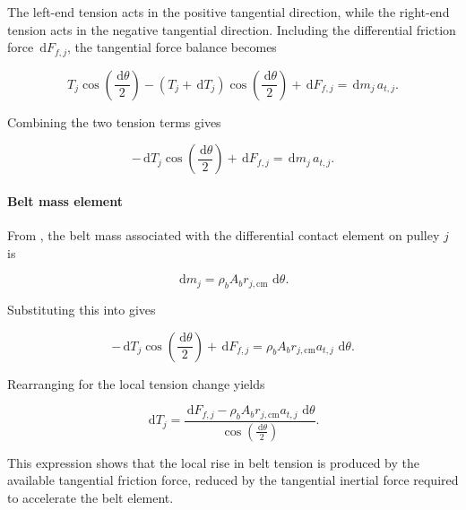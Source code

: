 \documentclass[11pt]{article}
\numberwithin{equation}{section}
\newcommand{\dd}{\,\mathrm{d}}
\begin{document}
The left-end tension acts in the positive tangential direction, while the
right-end tension acts in the negative tangential direction. Including the
differential friction force $\dd F_{f,j}$, the tangential force balance becomes

\begin{equation}
T_j\cos\!\left(\frac{\dd \theta}{2}\right)
-
(T_j+\dd T_j)\cos\!\left(\frac{\dd \theta}{2}\right)
+
\dd F_{f,j}
=
\dd m_j\,a_{t,j}.
\label{eq:tangential_balance_expanded}
\end{equation}

Combining the two tension terms gives

\begin{equation}
-\dd T_j \cos\!\left(\frac{\dd \theta}{2}\right)
+
\dd F_{f,j}
=
\dd m_j\,a_{t,j}.
\label{eq:tangential_balance_simplified}
\end{equation}

\paragraph{Belt mass element}

From , the belt mass associated with the differential
contact element on pulley $j$ is

\begin{equation}
\dd m_j = \rho_b A_b r_{j,\mathrm{cm}}\,\dd\theta.
\label{eq:dm_belt_element_repeat}
\end{equation}

Substituting this into  gives

\begin{equation}
-\dd T_j \cos\!\left(\frac{\dd \theta}{2}\right)
+
\dd F_{f,j}
=
\rho_b A_b r_{j,\mathrm{cm}} a_{t,j}\,\dd\theta.
\label{eq:tangential_balance_with_mass}
\end{equation}

Rearranging for the local tension change yields

\begin{equation}
\dd T_j
=
\frac{
\dd F_{f,j}
-
\rho_b A_b r_{j,\mathrm{cm}} a_{t,j}\,\dd\theta
}{
\cos\!\left(\frac{\dd \theta}{2}\right)
}.
\label{eq:dT_local_general}
\end{equation}

This expression shows that the local rise in belt tension is produced by the
available tangential friction force, reduced by the tangential inertial force
required to accelerate the belt element.
\end{document}

